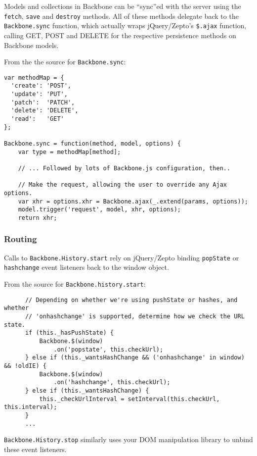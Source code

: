 \documentclass[9pt]{book}
\begin{document}
Models and collections in Backbone can be ``sync''ed with the server
using the \texttt{fetch}, \texttt{save} and \texttt{destroy} methods.
All of these methods delegate back to the \texttt{Backbone.sync}
function, which actually wraps jQuery/Zepto's \texttt{\$.ajax} function,
calling GET, POST and DELETE for the respective persistence methods on
Backbone models.

From the the source for \texttt{Backbone.sync}:

\begin{verbatim}
var methodMap = {
  'create': 'POST',
  'update': 'PUT',
  'patch':  'PATCH',
  'delete': 'DELETE',
  'read':   'GET'
};

Backbone.sync = function(method, model, options) {
    var type = methodMap[method];

    // ... Followed by lots of Backbone.js configuration, then..

    // Make the request, allowing the user to override any Ajax options.
    var xhr = options.xhr = Backbone.ajax(_.extend(params, options));
    model.trigger('request', model, xhr, options);
    return xhr;
\end{verbatim}

\subsubsection{Routing}\label{routing}

Calls to \texttt{Backbone.History.start} rely on jQuery/Zepto binding
\texttt{popState} or \texttt{hashchange} event listeners back to the
window object.

From the source for \texttt{Backbone.history.start}:

\begin{verbatim}
      // Depending on whether we're using pushState or hashes, and whether
      // 'onhashchange' is supported, determine how we check the URL state.
      if (this._hasPushState) {
          Backbone.$(window)
              .on('popstate', this.checkUrl);
      } else if (this._wantsHashChange && ('onhashchange' in window) && !oldIE) {
          Backbone.$(window)
              .on('hashchange', this.checkUrl);
      } else if (this._wantsHashChange) {
          this._checkUrlInterval = setInterval(this.checkUrl, this.interval);
      }
      ...
\end{verbatim}

\texttt{Backbone.History.stop} similarly uses your DOM manipulation
library to unbind these event listeners.
\end{document}
